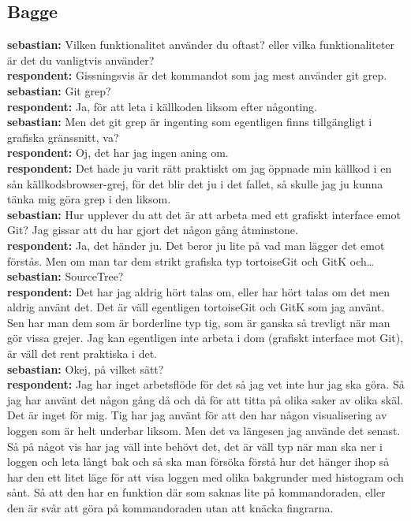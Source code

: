 \documentclass[a4paper,oneside]{bth} %
\begin{document}
		\subsection{Bagge}
		\textbf{sebastian:} Vilken funktionalitet använder du oftast? eller vilka funktionaliteter är det du vanligtvis använder?
		\\\textbf{respondent:} Gissningsvis är det kommandot som jag mest använder git grep.
		\\\textbf{sebastian:} Git grep?
		\\\textbf{respondent:} Ja, för att leta i källkoden liksom efter någonting.
		\\\textbf{sebastian:} Men det git grep är ingenting som egentligen finns tillgängligt i grafiska gränssnitt, va?
		\\\textbf{respondent:} Oj, det har jag ingen aning om.
		\\\textbf{respondent:} Det hade ju varit rätt praktiskt om jag öppnade min källkod i en sån källkodsbrowser-grej, för det blir det ju i det fallet, så skulle jag ju kunna tänka mig göra grep i den liksom.
		\\\textbf{sebastian:} Hur upplever du att det är att arbeta med ett grafiskt interface emot Git? Jag gissar att du har gjort det någon gång åtminstone.
		\\\textbf{respondent:} Ja, det händer ju. Det beror ju lite på vad man lägger det emot förstås. Men om man tar dem strikt grafiska typ tortoiseGit och GitK och…
		\\\textbf{sebastian:} SourceTree?
		\\\textbf{respondent:} Det har jag aldrig hört talas om, eller har hört talas om det men aldrig använt det. Det är väll egentligen tortoiseGit och GitK som jag använt.
		Sen har man dem som är borderline typ tig, som är ganska så trevligt när man gör vissa grejer.
		Jag kan egentligen inte arbeta i dom (grafiskt interface mot Git), är väll det rent praktiska i det.
		\\\textbf{sebastian:} Okej, på vilket sätt?
		\\\textbf{respondent:} Jag har inget arbetsflöde för det så jag vet inte hur jag ska göra. Så jag har använt det någon gång då och då för att titta på olika saker av olika skäl.
		Det är inget för mig.
		Tig har jag använt för att den har någon visualisering av loggen som är helt underbar liksom.
		Men det va längesen jag använde det senast. Så på något vis har jag väll inte behövt det, det är väll typ när man ska ner i loggen och leta långt bak och så ska man försöka förstå hur det hänger ihop så har den ett litet läge för att visa loggen med olika bakgrunder med histogram och sånt. Så att den har en funktion där som saknas lite på kommandoraden, eller den är svår att göra på kommandoraden utan att knäcka fingrarna.
\end{document}
